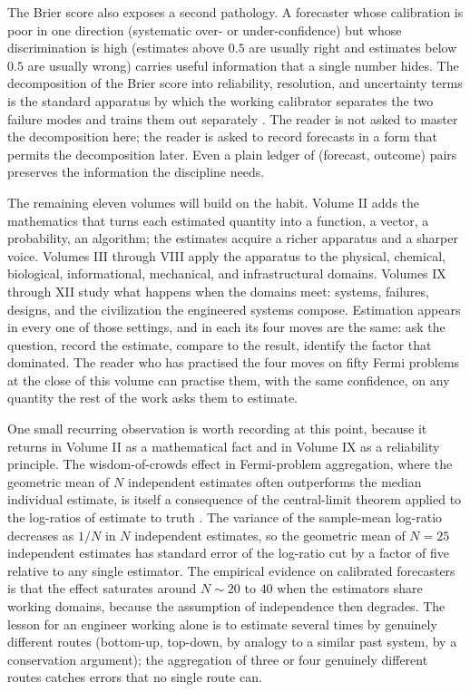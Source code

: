 The Brier score also exposes a second pathology. A forecaster
whose calibration is poor in one direction (systematic over- or
under-confidence) but whose discrimination is high (estimates
above $0.5$ are usually right and estimates below $0.5$ are
usually wrong) carries useful information that a single number
hides. The decomposition of the Brier score into reliability,
resolution, and uncertainty terms is the standard apparatus by
which the working calibrator separates the two failure modes
and trains them out separately
\cite{ch09-paper:bedford-cooke-2001}. The reader is not asked to
master the decomposition here; the reader is asked to record
forecasts in a form that permits the decomposition later. Even a
plain ledger of (forecast, outcome) pairs preserves the
information the discipline needs.

The remaining eleven volumes will build on the habit. Volume II
adds the mathematics that turns each estimated quantity into a
function, a vector, a probability, an algorithm; the estimates
acquire a richer apparatus and a sharper voice. Volumes III
through VIII apply the apparatus to the physical, chemical,
biological, informational, mechanical, and infrastructural
domains. Volumes IX through XII study what happens when the
domains meet: systems, failures, designs, and the civilization
the engineered systems compose. Estimation appears in every one
of those settings, and in each its four moves are the same: ask
the question, record the estimate, compare to the result,
identify the factor that dominated. The reader who has
practised the four moves on fifty Fermi problems at the close
of this volume can practise them, with the same confidence, on
any quantity the rest of the work asks them to estimate.

One small recurring observation is worth recording at this point,
because it returns in Volume II as a mathematical fact and in
Volume IX as a reliability principle. The wisdom-of-crowds effect
in Fermi-problem aggregation, where the geometric mean of $N$
independent estimates often outperforms the median individual
estimate, is itself a consequence of the central-limit theorem
applied to the log-ratios of estimate to truth
\cite{paper:ch09-cooke-expert-2008,
text:ch09-tetlock-superforecasting-2015}. The variance of the
sample-mean log-ratio decreases as $1/N$ in $N$ independent
estimates, so the geometric mean of $N = 25$ independent estimates
has standard error of the log-ratio cut by a factor of five
relative to any single estimator. The empirical evidence on
calibrated forecasters is that the effect saturates around $N \sim
20$ to $40$ when the estimators share working domains, because
the assumption of independence then degrades. The lesson for an
engineer working alone is to estimate several times by
genuinely different routes (bottom-up, top-down, by analogy to a
similar past system, by a conservation argument); the aggregation
of three or four genuinely different routes catches errors that
no single route can.

